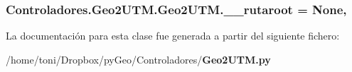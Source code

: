 \subsubsection[{\-\_\-\-\_\-rutaroot}]{\setlength{\rightskip}{0pt plus 5cm}Controladores.\-Geo2\-U\-T\-M.\-Geo2\-U\-T\-M.\-\_\-\-\_\-rutaroot = None\hspace{0.3cm}{\ttfamily [static]}, {\ttfamily [private]}}\label{classControladores_1_1Geo2UTM_1_1Geo2UTM_a00a6040cace91f137317c368e31dbcaf}


La documentación para esta clase fue generada a partir del siguiente fichero\-:\begin{DoxyCompactItemize}
\item 
/home/toni/\-Dropbox/py\-Geo/\-Controladores/{\bf Geo2\-U\-T\-M.\-py}\end{DoxyCompactItemize}
